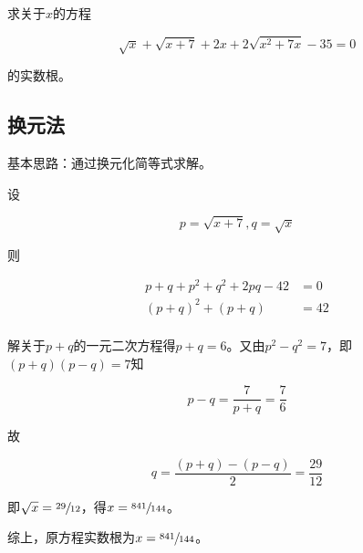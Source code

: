 

求关于$x$的方程

\[ \sqrt x + \sqrt{x + 7} + 2x + 2\sqrt{x^2 + 7x} - 35 = 0 \]

的实数根。


\subsection{换元法}

基本思路：通过换元化简等式求解。

设

\[ p = \sqrt{x + 7}, q = \sqrt x \]

则

\begin{align*}
  p + q + p^2 + q^2 + 2pq - 42 &= 0 \\
  (p + q)^2 + (p + q) &= 42 \\
\end{align*}

解关于$p + q$的一元二次方程得$p + q = 6$。又由$p^2 - q^2 = 7$，即$(p + q)(p - q) = 7$知

\[ p - q = \frac7{p + q} = \frac76 \]

故

\[ q = \frac{(p + q) - (p - q)}2 = \frac{29}{12} \]

即$\sqrt x = \sfrac{29}{12}$，得$x = \sfrac{841}{144}$。

综上，原方程实数根为$x = \sfrac{841}{144}$。
